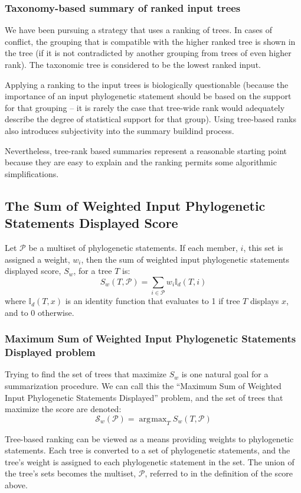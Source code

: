 \documentclass[11pt]{article}
\newcommand{\ps}{phylogenetic statement\xspace}
\newcommand{\pss}{phylogenetic statements\xspace}
\newcommand{\PSs}{Phylogenetic Statements\xspace}
\newcommand{\SWIPSD}{Sum of Weighted Input \PSs Displayed\xspace}
\newcommand{\MSWIPSD}{Maximum \SWIPSD \xspace}
\newcommand{\displaysPred}[2]{\ensuremath{\mathbb{I}_d(#1, #2)}}
\DeclareMathOperator*{\argmax}{\arg\!\max}
\begin{document}
\subsubsection{Taxonomy-based summary of ranked input trees}
We have been pursuing a strategy that uses a ranking of trees.
In cases of conflict, the grouping that is compatible with the 
    higher ranked tree is shown in the tree (if it is not contradicted by 
    another grouping from trees of even higher rank).
 The taxonomic tree is considered to be the lowest ranked input.

Applying a ranking to the input trees is biologically questionable (because
    the importance of an input \ps should be based on the support for that
    grouping -- it is rarely the case that tree-wide rank would adequately
    describe the degree of statistical support for that group).
Using tree-based ranks also introduces subjectivity into the summary buildind process.

Nevertheless, tree-rank based summaries represent a reasonable starting point
    because they are easy to explain and the ranking permits some algorithmic
    simplifications.

\subsection{The Sum of Weighted Input \PSs Displayed Score}
Let $\mathcal{P}$ be a multiset of \pss.
If each member, $i$, this set is assigned a weight, $w_i$, then the 
sum of weighted input \pss displayed score, $S_w$, for a tree $T$ is:
\begin{equation}
    S_w(T, \mathcal{P}) = \sum_{i\in \mathcal{P}} w_i \displaysPred{T}{i}
\end{equation}
where {\displaysPred{T}{x}} is an identity function that evaluates to 1 if tree $T$
        displays $x$, and to 0 otherwise.

\subsubsection{\MSWIPSD problem}
Trying to find the set of trees that maximize $S_w$ is one natural
    goal for a summarization procedure.
We can call this the ``\MSWIPSD''
problem,
    and the set of trees that maximize the score are denoted:
\begin{equation}
    \mathcal{S}_{w}(\mathcal{P}) = \argmax_T S_w(T,\mathcal{P}) 
\end{equation}

Tree-based ranking can be viewed as a means providing weights to \pss.
Each tree is converted to a set of \pss, and the tree's weight is 
    assigned to each \ps in the set.
The union of the tree's sets becomes the multiset, $\mathcal{P}$, referred to
    in the definition of the score above.
\end{document}

